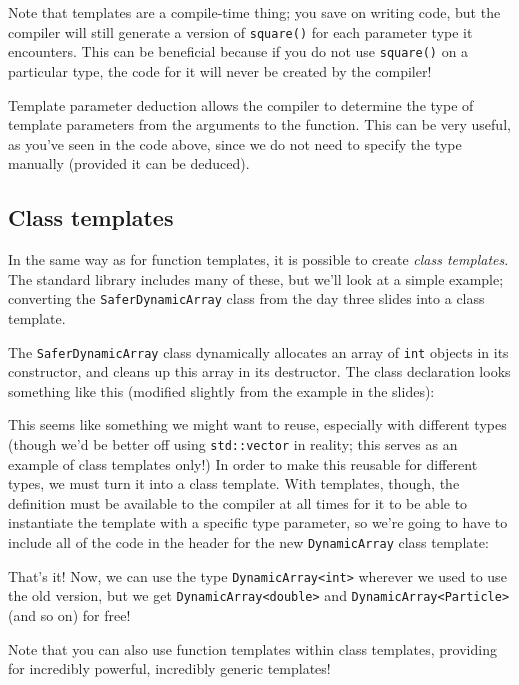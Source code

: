 \documentclass[a4paper]{scrartcl}
\begin{document}
Note that templates are a compile-time thing; you save on writing code, but the compiler will still generate a version of \verb|square()| for each parameter type it encounters. This can be beneficial because if you do not use \verb|square()| on a particular type, the code for it will never be created by the compiler!

Template parameter deduction allows the compiler to determine the type of template parameters from the arguments to the function. This can be very useful, as you've seen in the code above, since we do not need to specify the type manually (provided it can be deduced).

\subsection{Class templates}
In the same way as for function templates, it is possible to create \emph{class templates}. The standard library includes many of these, but we'll look at a simple example; converting the \verb|SaferDynamicArray| class from the day three slides into a class template.

The \verb|SaferDynamicArray| class dynamically allocates an array of \verb|int| objects in its constructor, and cleans up this array in its destructor. The class declaration looks something like this (modified slightly from the example in the slides):



This seems like something we might want to reuse, especially with different types (though we'd be better off using \verb|std::vector| in reality; this serves as an example of class templates only!) In order to make this reusable for different types, we must turn it into a class template. With templates, though, the definition must be available to the compiler at all times for it to be able to instantiate the template with a specific type parameter, so we're going to have to include all of the code in the header for the new \verb|DynamicArray| class template:



That's it! Now, we can use the type \verb|DynamicArray<int>| wherever we used to use the old version, but we get \verb|DynamicArray<double>| and \verb|DynamicArray<Particle>| (and so on) for free! 

Note that you can also use function templates within class templates, providing for incredibly powerful, incredibly generic templates!
\end{document}
